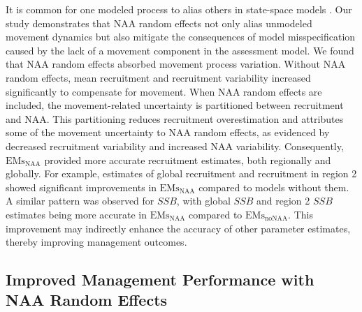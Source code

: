 \documentclass[
  12pt,
]{article}
\begin{document}
It is common for one modeled process to alias others in state-space
models \citep{Stock2021b}. Our study demonstrates that NAA random
effects not only alias unmodeled movement dynamics but also mitigate the
consequences of model misspecification caused by the lack of a movement
component in the assessment model. We found that NAA random effects
absorbed movement process variation. Without NAA random effects, mean
recruitment and recruitment variability increased significantly to
compensate for movement. When NAA random effects are included, the
movement-related uncertainty is partitioned between recruitment and NAA.
This partitioning reduces recruitment overestimation and attributes some
of the movement uncertainty to NAA random effects, as evidenced by
decreased recruitment variability and increased NAA variability.
Consequently, \(\text{EMs}_{\scriptscriptstyle \text{NAA}}\) provided
more accurate recruitment estimates, both regionally and globally. For
example, estimates of global recruitment and recruitment in region 2
showed significant improvements in
\(\text{EMs}_{\scriptscriptstyle \text{NAA}}\) compared to models
without them. A similar pattern was observed for \(SSB\), with global
\(SSB\) and region 2 \(SSB\) estimates being more accurate in
\(\text{EMs}_{\scriptscriptstyle \text{NAA}}\) compared to
\(\text{EMs}_{\scriptscriptstyle \text{noNAA}}\). This improvement may
indirectly enhance the accuracy of other parameter estimates, thereby
improving management outcomes.

\hypertarget{improved-management-performance-with-naa-random-effects}{%
\subsection{Improved Management Performance with NAA Random
Effects}\label{improved-management-performance-with-naa-random-effects}}
\end{document}
